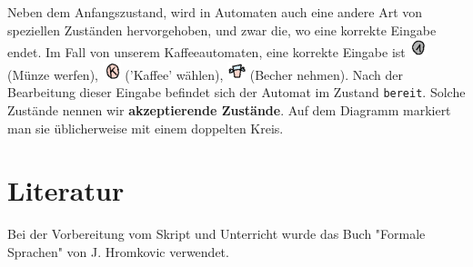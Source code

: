 \documentclass{article}
\begin{document}
Neben dem Anfangszustand, wird in Automaten auch eine andere Art von speziellen Zuständen hervorgehoben, und zwar die, wo eine korrekte Eingabe endet. Im Fall von unserem Kaffeeautomaten, eine korrekte Eingabe ist \includegraphics[width=20px]{Pictures/Muenze.png} (Münze werfen), \includegraphics[width=20px]{Pictures/Kaffee.png} ('Kaffee' wählen), \includegraphics[width=20px]{Pictures/Becher.png} (Becher nehmen). Nach der Bearbeitung dieser Eingabe befindet sich der Automat im Zustand \texttt{bereit}. Solche Zustände nennen wir \textbf{akzeptierende Zustände}. Auf dem Diagramm markiert man sie üblicherweise mit einem doppelten Kreis.

\section{Literatur}
Bei der Vorbereitung vom Skript und Unterricht wurde das Buch "Formale Sprachen" von J. Hromkovic verwendet.
\end{document}
